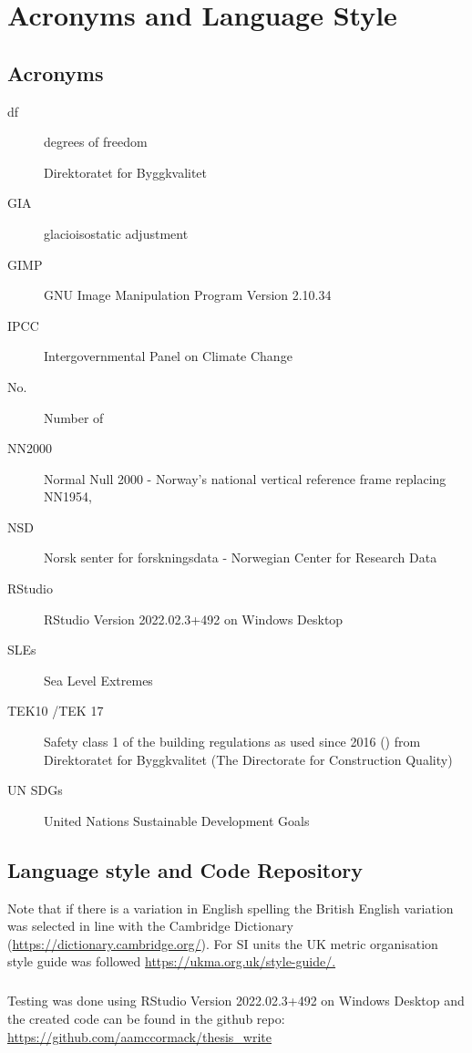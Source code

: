 \chapter{Acronyms and Language Style}

\section{Acronyms}
\begin{description}
\item[df]degrees of freedom
\item[] Direktoratet for Byggkvalitet 
\item[GIA] glacioisostatic adjustment
\item[GIMP] GNU Image Manipulation Program Version 2.10.34
\item[IPCC] Intergovernmental Panel on Climate Change 
\item[No.] Number of
\item[NN2000] Normal Null 2000 - Norway's national vertical reference frame replacing NN1954, 
\item[NSD] Norsk senter for forskningsdata - Norwegian Center for Research Data
\item [RStudio] RStudio Version 2022.02.3+492 on Windows Desktop
\item[SLEs] Sea Level Extremes
\item[TEK10 /TEK 17] Safety class 1 of the building regulations as used since 2016 (\cite{tides_high_2022}) from Direktoratet for Byggkvalitet (The Directorate for Construction Quality)
\item [UN SDGs] United Nations Sustainable Development Goals 
\end{description}

\section{Language style and Code Repository}
Note that if there is a variation in English spelling the British English variation was selected in line with the Cambridge Dictionary (\url{https://dictionary.cambridge.org/}). For SI units the UK metric organisation style guide was followed \url{https://ukma.org.uk/style-guide/.}  
\paragraph{}
Testing was done using RStudio Version 2022.02.3+492 on Windows Desktop and the created code can be found in the github repo: 
\url{ https://github.com/aamccormack/thesis_write}